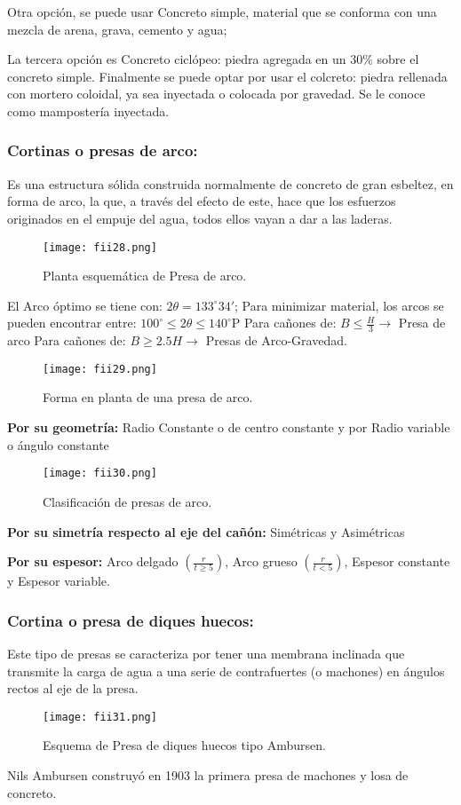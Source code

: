 Otra opción, se puede usar Concreto simple, material que se conforma con una mezcla de arena, grava, cemento y agua;

La tercera opción es Concreto ciclópeo: piedra agregada en un 30\% sobre el concreto simple. Finalmente se puede optar por usar el colcreto: piedra rellenada con mortero coloidal, ya sea inyectada o
colocada por gravedad. Se le conoce como mampostería inyectada.

\subsubsection{Cortinas o presas de arco:} Es una estructura sólida construida normalmente de concreto de gran esbeltez, en forma de arco, la que, a través del efecto de este, hace que los esfuerzos originados en el empuje del agua, todos ellos vayan a dar a las laderas.

\begin{figure}[h!]
	\centerline{\texttt{[image: fii28.png]}}
	\caption{ Planta esquemática de Presa de arco.}
	\label{fii28}
\end{figure}

El Arco óptimo se tiene con: $2\theta = 133^{\circ} 34'$; Para minimizar material, los arcos se pueden encontrar entre: $100^{\circ} \leq  2\theta \leq  140^{\circ}$P
Para cañones de: $B \leq \frac{H}{3} \longrightarrow$ Presa de arco
Para cañones de: $B \geq 2.5H \longrightarrow$ Presas de Arco-Gravedad.
\begin{figure}[h!]
	\centerline{\texttt{[image: fii29.png]}}
	\caption{Forma en planta de una presa de arco.}
	\label{fii29}
\end{figure}
\textbf{Por su geometría:} Radio Constante o de centro constante y por Radio variable o ángulo constante
\begin{figure}[h!]
	\centerline{\texttt{[image: fii30.png]}}
	\caption{Clasificación de presas de arco.}
	\label{fii30}
\end{figure}
\textbf{Por su simetría respecto al eje del cañón:} Simétricas y Asimétricas



\textbf{Por su espesor:} Arco delgado $( \frac{r}{t\geq 5} )$, Arco grueso $( \frac{r}{t < 5})$, Espesor constante y Espesor variable.

\subsubsection{Cortina o presa de diques huecos:} Este tipo de presas se caracteriza por tener una membrana inclinada que
transmite la carga de agua a una serie de contrafuertes (o machones) en ángulos rectos al eje de la presa.
\begin{figure}[h!]
	\centerline{\texttt{[image: fii31.png]}}
	\caption{Esquema de Presa de diques huecos tipo Ambursen.}
	\label{fii31}
\end{figure}
Nils Ambursen construyó en 1903 la primera presa de machones y losa de concreto.

